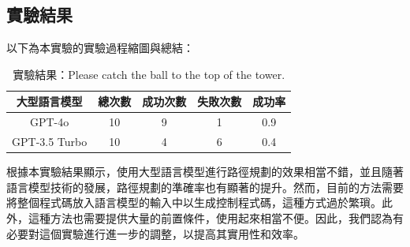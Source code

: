 \documentclass[class=NCU_thesis, crop=false]{standalone}
\begin{document}
\subsection{實驗結果}
以下為本實驗的實驗過程縮圖與總結：\\

\begin{table}[h]
    \centering
    \caption{實驗結果：Please catch the ball to the top of the tower.}
    \begin{tabular}{ccccc}
    \hline
    大型語言模型 & 總次數 & 成功次數 & 失敗次數 & 成功率 \\
    \hline
    GPT-4o & 10 & 9 & 1 & 0.9\\
    \hline
    GPT-3.5 Turbo & 10 & 4 & 6 & 0.4\\
    \hline
    \end{tabular}
\end{table}

根據本實驗結果顯示，使用大型語言模型進行路徑規劃的效果相當不錯，並且隨著語言模型技術的發展，路徑規劃的準確率也有顯著的提升。然而，目前的方法需要將整個程式碼放入語言模型的輸入中以生成控制程式碼，這種方式過於繁瑣。此外，這種方法也需要提供大量的前置條件，使用起來相當不便。因此，我們認為有必要對這個實驗進行進一步的調整，以提高其實用性和效率。
\end{document}
